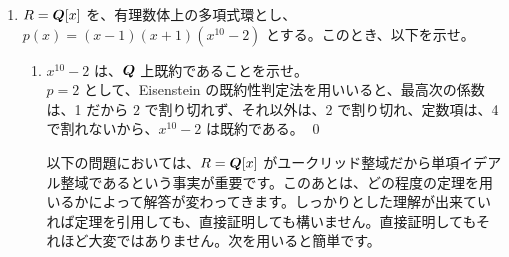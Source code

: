 \begin{enumerate}
\begin{enumerate}
     \item 上の $I$ と、$I'$ において、$I'$ が $R'$ の素イデアルならば、$I = f^{-1}(I')$ も素イデアルであることを示せ。\\
     \sol
     $I'$ は $R'$ の素イデアルだから、$R'/I'$ は整域である。ここで、$g = \pi\circ f$、$\pi$ は、$R'\to R'/I'$ なる自然な準同型とする。
     $$\ker g = f^{-1}(\ker \pi) = f^{-1}(I') = I$$
     だから前問より、$I$ は、$R$ の素イデアルである。
     \qed\\
     {\gt 別解．}\quad
     (b) より $I$ はイデアル。$x,y\in R$ で、$xy\in I$ とする。$I'\ni f(xy) = f(x)f(y)$ で、$I'$ が素イデアルだから、$f(x)\in I'$ または、$f(y)\in I'$。従って、$x\in I$ 又は、$y\in I$。これより、$I$ が素イデアルであることが分かる。この議論は (a) の証明にも同様に用いられる。
     \qed
     
     \item $R$ が単項イデアル整域ならば、$S^{-1}R$ も単項イデアル整域であることを示せ。
     \sol
     $I'$ を $S^{-1}R$ のイデアルとする。$f:R\to S^{-1}R$ を自然な準同型とすると、$I = f^{-1}(I')$ は (b) より単項イデアル整域 $R$ のイデアルだから、$I = (a)$ とかける。ここで、$I' = S^{-1}Rf(a)$ であることを示せばよい。$f(a)\in I'$ だから、$I' \supset S^{-1}Rf(a)$ であることは明か。$x/s\in I'$ とする。$f(x) = x/1 = sx/s \in I'$ だから、$x\in I$。$x = ra$、$r\in R$ とすると、
     $$x/s = ra/s = r/s(a/1) = r/sf(a)\in S^{-1}Rf(a)$$
     だから $I' \subset S^{-1}Rf(a)$ も成り立ち、$I'$ は単項イデアルとなる。
     \qed
          \end{enumerate}

\newpage         
\item $R = \mbox{\boldmath $Q$}[x]$ を、有理数体上の多項式環とし、$p(x) = (x-1)(x+1)(x^{10 }-2)$ とする。このとき、以下を示せ。
     \begin{enumerate}
     \item $x^{10 }- 2$ は、$\mbox{\boldmath $Q$}$ 上既約であることを示せ。\\
     \sol
     $p = 2$ として、Eisenstein の既約性判定法を用いいると、最高次の係数は、1 だから $2$ で割り切れず、それ以外は、$2$ で割り切れ、定数項は、4 で割れないから、$x^{10}-2$ は既約である。
     \qed
     
     \smallskip
     以下の問題においては、$R = \mbox{\boldmath $Q$}[x]$ がユークリッド整域だから単項イデアル整域であるという事実が重要です。このあとは、どの程度の定理を用いるかによって解答が変わってきます。しっかりとした理解が出来ていれば定理を引用しても、直接証明しても構いません。直接証明してもそれほど大変ではありません。次を用いると簡単です。
     

\end{enumerate}
\end{enumerate}
